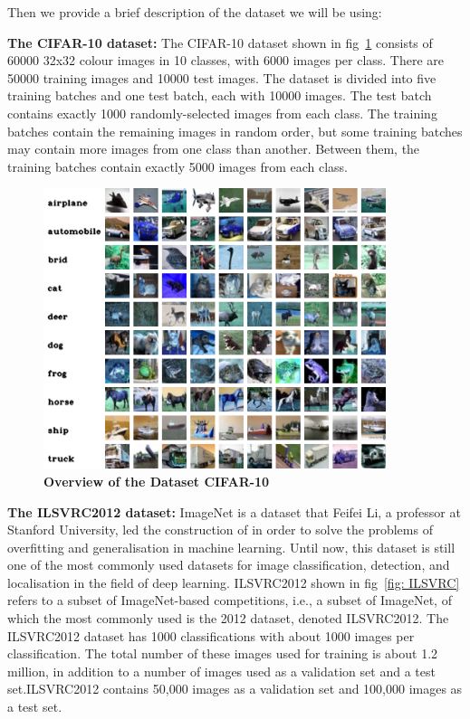 \documentclass[journal,article,submit,pdftex,moreauthors]{Definitions/mdpi}
\begin{document}
Then we provide a brief description of the dataset we will be using:

\textbf{The CIFAR-10 dataset:}
The CIFAR-10 dataset shown in fig~\ref{fig: CIFAR-10} consists of 60000 32x32 colour images in 10 classes, with 6000 images per class. There are 50000 training images and 10000 test images.
The dataset is divided into five training batches and one test batch, each with 10000 images. The test batch contains exactly 1000 randomly-selected images from each class. The training batches contain the remaining images in random order, but some training batches may contain more images from one class than another. Between them, the training batches contain exactly 5000 images from each class.

\begin{figure} [h]
	\centering
	\includegraphics[width=10cm]{figs/CIFAR-10.png}
    \captionsetup{justification=centering}
	\caption{\textbf{Overview of the Dataset CIFAR-10}}
	\label{fig: CIFAR-10}
\end{figure}

\textbf{The ILSVRC2012 dataset:}
ImageNet is a dataset that Feifei Li, a professor at Stanford University, led the construction of in order to solve the problems of overfitting and generalisation in machine learning. Until now, this dataset is still one of the most commonly used datasets for image classification, detection, and localisation in the field of deep learning.
ILSVRC2012 shown in fig~\ref{fig: ILSVRC} refers to a subset of ImageNet-based competitions, i.e., a subset of ImageNet, of which the most commonly used is the 2012 dataset, denoted ILSVRC2012.
The ILSVRC2012 dataset has 1000 classifications with about 1000 images per classification. The total number of these images used for training is about 1.2 million, in addition to a number of images used as a validation set and a test set.ILSVRC2012 contains 50,000 images as a validation set and 100,000 images as a test set.
\end{document}
